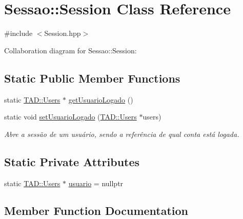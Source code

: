 \hypertarget{class_sessao_1_1_session}{}\section{Sessao\+:\+:Session Class Reference}
\label{class_sessao_1_1_session}


{\ttfamily \#include $<$Session.\+hpp$>$}



Collaboration diagram for Sessao\+:\+:Session\+:
\subsection*{Static Public Member Functions}
\begin{DoxyCompactItemize}
\item 
static \hyperlink{class_t_a_d_1_1_users}{T\+A\+D\+::\+Users} $\ast$ \hyperlink{class_sessao_1_1_session_af83a9a8ebcade48b6a2f58c81f539763}{get\+Usuario\+Logado} ()
\item 
static void \hyperlink{class_sessao_1_1_session_a30fdda279777bd63c60c5e2b8a32d6d9}{set\+Usuario\+Logado} (\hyperlink{class_t_a_d_1_1_users}{T\+A\+D\+::\+Users} $\ast$users)
\begin{DoxyCompactList}\small\item\em Abre a sessão de um usuário, sendo a referência de qual conta está logada. \end{DoxyCompactList}\end{DoxyCompactItemize}
\subsection*{Static Private Attributes}
\begin{DoxyCompactItemize}
\item 
static \hyperlink{class_t_a_d_1_1_users}{T\+A\+D\+::\+Users} $\ast$ \hyperlink{class_sessao_1_1_session_a195b8a1008c331628c9dc566e7c41b2d}{usuario} = nullptr
\end{DoxyCompactItemize}


\subsection{Member Function Documentation}
\mbox{\label{class_sessao_1_1_session_af83a9a8ebcade48b6a2f58c81f539763}} 
